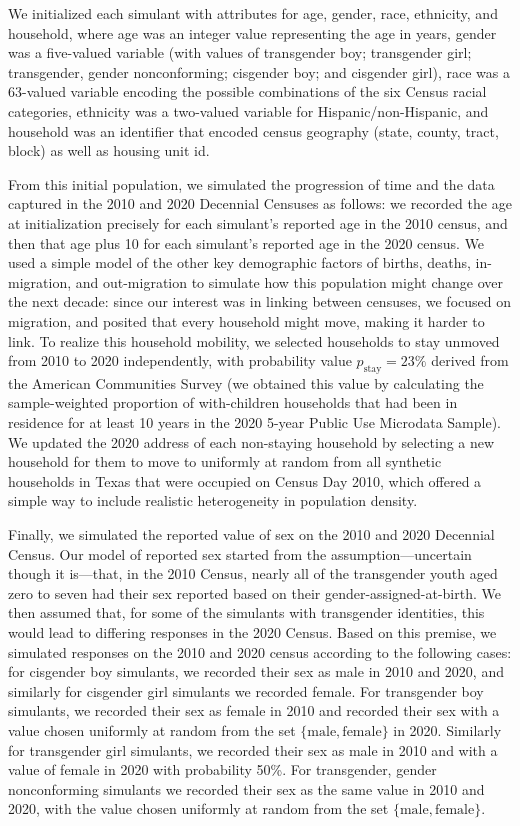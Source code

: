 \documentclass{jpc} %
\theoremstyle{plain}\newtheorem{satz}[thm]{Satz} %
\begin{document}
We initialized each simulant with attributes for age, gender, race, ethnicity, and household, where age was an integer value representing the age in years, gender was a five-valued variable (with values of transgender boy; transgender girl; transgender, gender nonconforming; cisgender boy; and cisgender girl), race was a 63-valued variable encoding the possible combinations of the six Census racial categories, ethnicity was a two-valued variable for Hispanic/non-Hispanic, and household was an identifier that encoded census geography (state, county, tract, block) as well as housing unit id.

From this initial population, we simulated the progression of time and the data captured in the 2010 and 2020 Decennial Censuses as follows: we recorded the age at initialization precisely for each simulant's reported age in the 2010 census, and then that age plus 10 for each simulant's reported age in the 2020 census.  We used a simple model of the other key demographic factors of births, deaths, in-migration, and out-migration to simulate how this population might change over the next decade: since our interest was in linking between censuses, we focused on migration, and posited that every household might move, making it harder to link. To realize this household mobility, we selected households to stay unmoved from 2010 to 2020 independently, with probability value $p_{\text{stay}} = 23\%$ derived from the American Communities Survey (we obtained this value by calculating the sample-weighted proportion of with-children households that had been in residence for at least 10 years in the 2020 5-year Public Use Microdata Sample).  We updated the 2020 address of each non-staying household by selecting a new household for them to move to uniformly at random from all synthetic households in Texas that were occupied on Census Day 2010, which offered a simple way to include realistic heterogeneity in population density.

Finally, we simulated the reported value of sex on the 2010 and 2020 Decennial Census. Our model of reported sex started from the assumption---uncertain though it is---that, in the 2010 Census, nearly all of the transgender youth aged zero to seven had their sex reported based on their gender-assigned-at-birth. We then assumed that, for some of the simulants with transgender identities, this would lead to differing responses in the 2020 Census.
Based on this premise, we simulated responses on the 2010 and 2020 census according to the following cases: for cisgender boy simulants, we recorded their sex as male in 2010 and 2020, and similarly for cisgender girl simulants we recorded female.  For transgender boy simulants, we recorded their sex as female in 2010 and recorded their sex with a value chosen uniformly at random from the set $\{\text{male}, \text{female}\}$ in 2020.  Similarly for transgender girl simulants, we recorded their sex as male in 2010 and with a value of female in 2020 with probability 50\%.  For transgender, gender nonconforming simulants we recorded their sex as the same value in 2010 and 2020, with the value chosen uniformly at random from the set $\{\text{male}, \text{female}\}$.
\end{document}
